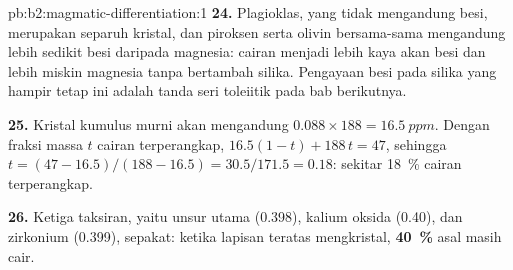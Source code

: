 \begin{solution}{pb:b2:magmatic-differentiation:1}
\textbf{24.} Plagioklas, yang tidak mengandung besi, merupakan separuh kristal, dan
piroksen serta olivin bersama-sama mengandung lebih sedikit besi daripada magnesia: cairan
menjadi lebih kaya akan besi dan lebih miskin magnesia tanpa bertambah silika. Pengayaan
besi pada silika yang hampir tetap ini adalah tanda seri toleiitik pada
bab berikutnya.

\textbf{25.} Kristal kumulus murni akan mengandung $0.088\times188 = \qty{16.5}{ppm}$. Dengan
fraksi massa $t$ cairan terperangkap, $16.5(1 - t) + 188\,t = 47$, sehingga $t = (47 -
16.5)/(188 - 16.5) = 30.5/171.5 = 0.18$: sekitar \qty{18}{\percent} cairan terperangkap.

\textbf{26.} Ketiga taksiran, yaitu unsur utama (0.398), kalium oksida (0.40), dan
zirkonium (0.399), sepakat: ketika lapisan teratas mengkristal,
\textbf{\qty[text-series-to-math=true]{40}{\percent}}  asal masih
cair.
\end{solution}
